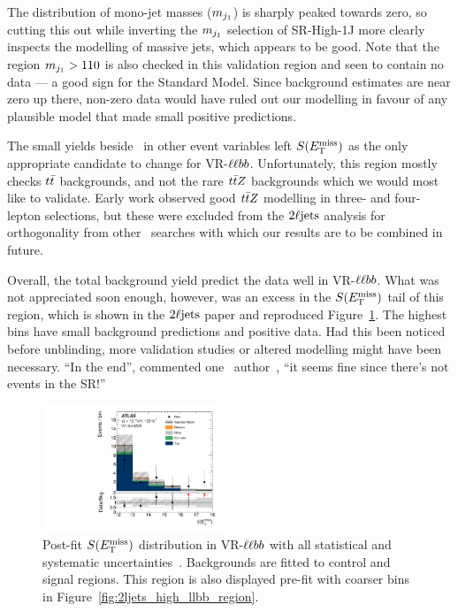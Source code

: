 The distribution of mono-jet masses ($m_{j_1}$) is sharply peaked towards zero,
so cutting this out while inverting the $m_{j_1}$ selection of SR-High-1J
more clearly inspects the modelling of massive jets, which appears to be good.
Note that the region $m_{j_1} > 110$ is also checked in this validation region
and seen to contain no data --- a good sign for the Standard Model.
Since background estimates are near zero up there, non-zero data would have
ruled out our modelling in favour of any plausible model that made small
positive predictions.

The small yields beside \srllbb\ in other event variables left $\metsig$ as
the only appropriate candidate to change for VR-$\llbb$.
Unfortunately, this region mostly checks $t\bar t$ backgrounds, and not the
rare $t\bar t Z$ backgrounds which we would most like to validate.
Early work observed good $t\bar t Z$ modelling in three- and four- lepton
selections, but these were excluded from the $2\ell\mathrm{jets}$ analysis for
orthogonality from other \atlas\ searches with which our results are to be
combined in future.

Overall, the total background yield predict the data well in VR-$\llbb$.
What was not appreciated soon enough, however, was an excess in the $\metsig$
tail of this region, which is shown in the $2\ell\mathrm{jets}$ paper and reproduced
Figure~\ref{fig:2ljets_high_metsig_vrllbb_paper}.
The highest bins have small background predictions and positive data.
Had this been noticed before unblinding, more validation studies or altered
modelling might have been necessary.
``In the end'', commented one \atlas\ author~\cite{comment2022vrllbb},
``it seems fine since there's not events in the SR!''

\begin{figure}[tp]
\centering
\includegraphics[width=0.48\textwidth]{figures/2ljets_vr_llbb_met_sig.pdf}
\caption[
Post-fit $\metsig$ distribution in VR-$\llbb$
]{%
Post-fit $\metsig$ distribution in VR-$\llbb$ with all statistical and
systematic uncertainties~\cite{atlas2022searches}.
Backgrounds are fitted to control and signal regions.
This region is also displayed pre-fit with coarser bins in
Figure~\ref{fig:2ljets_high_llbb_region}.
}
\label{fig:2ljets_high_metsig_vrllbb_paper}
\end{figure}


